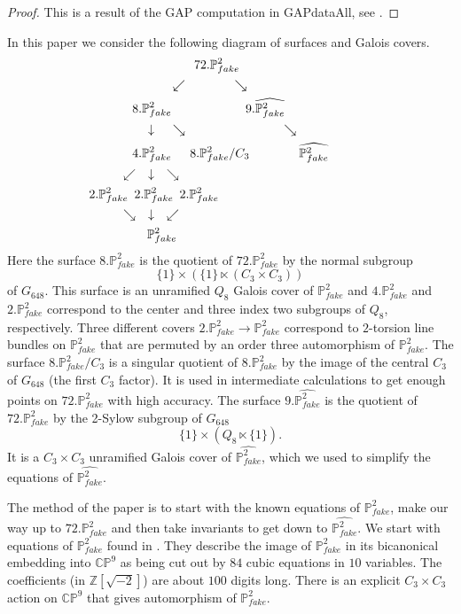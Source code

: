 \documentclass[11pt,reqno]{amsart}
\def\C {{\mathbb C}}
\def\Z {{\mathbb Z}}
\def\P {{\mathbb P}}
\def\FPP {{\P^2_{fake}}}
\theoremstyle{definition}
\numberwithin{equation}{section}
\begin{document}
\begin{proof}
This is a result of the GAP computation in GAPdataAll, see \cite{BW+}.
\end{proof}


In this paper 
we consider the following diagram of surfaces and Galois covers.
\begin{align*}
& \hskip 50pt 72.\FPP \\
&\hskip 30pt\swarrow\hskip 40pt \searrow\\
&8.\FPP       \hskip 60pt            9.\widehat\FPP\\
&\hskip 10pt\downarrow       \hskip 15pt  \searrow   \hskip 80pt        \searrow\\
&4.\FPP \hskip 15pt 8.\FPP /C_3    \hskip 40pt            \widehat\FPP\\
&\hskip -10pt \swarrow \hskip 10pt\downarrow    \hskip10pt\searrow \\
&\hskip -35pt 2.\FPP \hskip 5pt 2.\FPP  \hskip 5pt  2.\FPP\\
&\hskip -10pt \searrow \hskip 10pt\downarrow    \hskip10pt\swarrow \\
&\hskip 12 pt \FPP
\end{align*}
Here the surface $8.\FPP$ is the quotient of $72.\FPP$ by the normal subgroup
$$
\{1\}\times  \left( \{1\} \ltimes (C_3\times C_3)\right)
$$
of $G_{648}$. This surface is an unramified $Q_8$ Galois cover of $\FPP$
and $4.\FPP$ and $2.\FPP$ correspond to the center and three index two subgroups of $Q_8$, respectively. Three different covers 
$2.\FPP\to \FPP$ correspond to $2$-torsion line bundles on $\FPP$ that are permuted by an order three automorphism of $\FPP$.
The surface $8.\FPP /C_3$ is a singular quotient of $8.\FPP$ by the image of the central $C_3$ of $G_{648}$ (the first $C_3$ factor). It is used in intermediate calculations to get enough points on $72.\FPP$ with high accuracy. The surface $9.\widehat\FPP$ is the quotient of $72.\FPP $
 by the 2-Sylow subgroup of $G_{648}$
$$
 \{1\}\times  \left( Q_8 \ltimes \{1\}\right).
$$
It is a $C_3\times C_3$ unramified Galois cover of  $\widehat\FPP$, which we used to simplify the equations of $\widehat\FPP$.

\medskip
The method of the paper is to start with the known equations of $\FPP$, make our way up to $72.\FPP$ and then take invariants to get down to 
 $\widehat\FPP$. We start with equations of $\FPP$ found in \cite{BBF}. They describe the image of $\FPP$ in its bicanonical embedding into $\C\P^9$ as being cut out by $84$ cubic equations in $10$ variables. The coefficients (in $\Z[\sqrt{-2}]$) are about $100$ digits long. There is an explicit $C_3\times C_3$ action on $\C\P^9$ that gives automorphism of $\FPP$.
\end{document}
